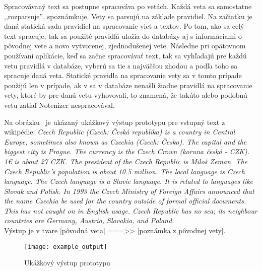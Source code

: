 Spracovávaný text sa postupne spracováva po vetách. Každá veta sa samostatne ,,rozparsuje'', spoznámkuje. Vety sa parsujú na základe pravidiel. Na začiatku je daná statická sada pravidiel na spracovanie viet a textov. Po tom, ako sa celý text spracuje, tak sa použité pravidlá uložia do databázy aj s informáciami o pôvodnej vete a novo vytvorenej, zjednodušenej vete. Následne pri opätovnom používaní aplikácie, keď sa začne spracovávať text, tak sa vyhľadajú pre každú vetu pravidlá v databáze, vyberú sa tie s najväčšou zhodou a podľa toho sa spracuje daná veta. Statické pravidla na spracovanie vety sa v tomto prípade použijú len v prípade, ak v sa v databáze nenašli žiadne pravidlá na spracovanie vety, ktoré by pre danú vetu vyhovovali, to znamená, že takúto alebo podobnú vetu zatiaľ Notenizer nespracovával.

Na obrázku~ je ukázaný ukážkový výstup prototypu pre vstupný text z wikipédie:
\textit{Czech Republic (Czech: Česká republika) is a country in Central Europe, sometimes also known as Czechia (Czech: Česko). The capital and the biggest city is Prague. The currency is the Czech Crown (koruna česká - CZK). 1€ is about 27 CZK. The president of the Czech Republic is Miloš Zeman. The Czech Republic's population is about 10.5 million. The local language is Czech language. The Czech language is a Slavic language. It is related to languages like Slovak and Polish. In 1993 the Czech Ministry of Foreign Affairs announced that the name Czechia be used for the country outside of formal official documents. This has not caught on in English usage. Czech Republic has no sea; its neighbour countries are Germany, Austria, Slovakia, and Poland.}
\\

Výstup je v tvare [pôvodná veta] ===>> [poznámka z pôvodnej vety].

\begin{figure}[H]
\begin{center}\texttt{[image: example\_output]}\end{center}
\caption[Ukážkový výstup prototypu]{Ukážkový výstup prototypu}\label{fig:example_output}
\end{figure}


